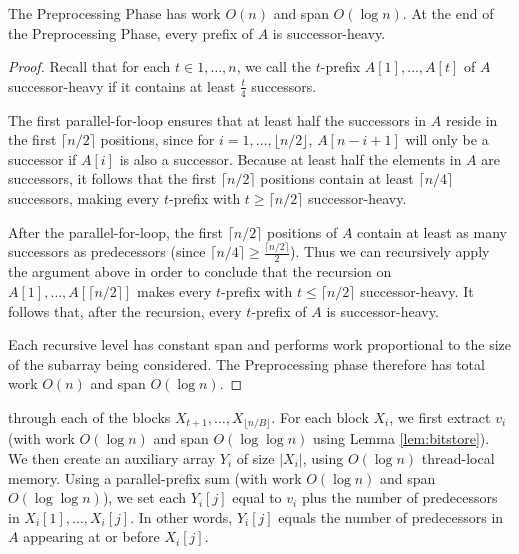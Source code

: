 \documentclass[a4paper,UKenglish,cleveref, autoref, thm-restate]{lipics-v2019}
\begin{document}
\begin{lemma}
 The Preprocessing Phase has work $O(n)$ and span $O(\log n)$. At the
 end of the Preprocessing Phase, every prefix of $A$ is
 successor-heavy.
  \label{lem:preprocessingphase}
\end{lemma}
\begin{proof}
Recall that for each $t \in 1, \ldots, n$, we call the $t$-prefix
$A[1], \ldots, A[t]$ of $A$ successor-heavy if it contains at least
$\frac{t}{4}$ successors.

The first parallel-for-loop ensures that at least half the successors
in $A$ reside in the first $\lceil n / 2 \rceil$ positions, since for
$i = 1, \ldots, \lfloor n / 2 \rfloor$, $A[n - i + 1]$ will only be a
successor if $A[i]$ is also a successor. Because at least half the
elements in $A$ are successors, it follows that the first $\lceil n /
2 \rceil$ positions contain at least $\lceil n / 4\rceil$ successors,
making every $t$-prefix with $t \ge \lceil n / 2 \rceil$
successor-heavy.

After the parallel-for-loop, the first $\lceil n / 2 \rceil$ positions
of $A$ contain at least as many successors as predecessors (since
$\lceil n / 4 \rceil \ge \frac{\lceil n / 2 \rceil}{2}$). Thus we can
recursively apply the argument above in order to conclude that the
recursion on $A[1], \ldots, A[\lceil n / 2 \rceil]$ makes every
$t$-prefix with $t \le \lceil n / 2 \rceil$ successor-heavy. It
follows that, after the recursion, every $t$-prefix of $A$ is
successor-heavy.

Each recursive level has constant span and performs work proportional
to the size of the subarray being considered. The Preprocessing phase
therefore has total work $O(n)$ and span $O(\log n)$.
\end{proof}



through each of the blocks $X_{t + 1}, \ldots, X_{\lfloor n / B \rfloor}$. For each block
$X_i$, we first extract $v_i$ (with work $O(\log n)$ and span $O(\log
\log n)$ using Lemma \ref{lem:bitstore}). We then create an auxiliary
array $Y_i$ of size $|X_i|$, using $O(\log n)$ thread-local
memory. Using a parallel-prefix sum (with work $O(\log n)$ and span
$O(\log \log n)$), we set each $Y_i[j]$ equal to $v_i$ plus the number
of predecessors in $X_i[1], \ldots, X_i[j]$. In other words, $Y_i[j]$
equals the number of predecessors in $A$ appearing at or before
$X_i[j]$.
\end{document}
